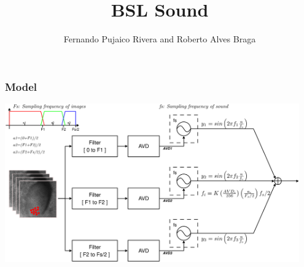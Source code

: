 \documentclass{beamer} %
\author{Fernando Pujaico Rivera and Roberto Alves Braga}
\title{BSL Sound}
\begin{document}
\frame{\titlepage}


\begin{frame}
\frametitle{Model}
\begin{center}
 \includegraphics[width=0.95\textwidth]{./images/Diagrama1.png}
\end{center}
\end{frame}
\end{document}

